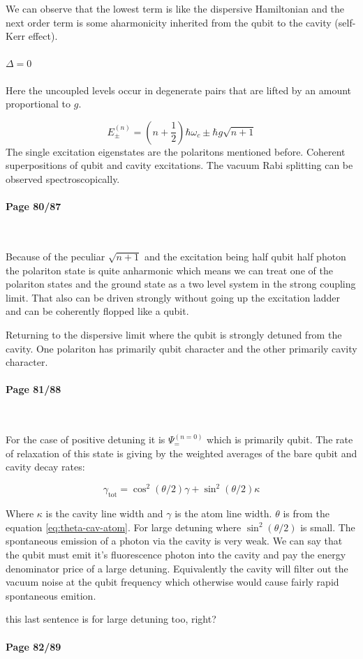 \documentclass[12pt]{article}
\numberwithin{equation}{subsection}
\newcommand\ask[1]{
{\color{red}
#1
}
}
\newcommand\page[1]{
{
\color{blue}\paragraph{
Page #1
}\mbox{}\\
}
}
\begin{document}
We can observe that the lowest term is like the dispersive Hamiltonian \label{eq:dispersiveH} and the next order term is some aharmonicity inherited from the qubit to the cavity (self-Kerr effect). 

\paragraph{$\Delta = 0$}  Here the uncoupled levels occur in degenerate pairs that are lifted by an amount proportional to $g$.

\begin{equation}
    E^{(n)}_\pm =\left(n+\frac{1}{2}\right) \hbar \omega_c \pm \hbar g \sqrt{n+1}
\end{equation}
The single excitation eigenstates are the polaritons mentioned before. Coherent superpositions of qubit and cavity excitations. The vacuum Rabi splitting can be observed spectroscopically. 
\page{80/87}
Because of the peculiar $\sqrt{n+1}$ and the excitation being half qubit half photon the polariton state is quite anharmonic which means we can treat one of the polariton states and the ground state as a two level system in the strong coupling limit. That also can be driven strongly without going up the excitation ladder and can be coherently flopped like a qubit.

Returning to the dispersive limit where the qubit is strongly detuned from the cavity. One polariton has primarily qubit character and the other primarily cavity character.

\page{81/88}

For the case of positive detuning it is $\Psi_=^{(n=0)}$ which is primarily qubit.
The rate of relaxation of this state is giving by the weighted averages of the bare qubit and cavity decay rates:

\begin{equation}
    \gamma_{\textrm{tot}} = \cos^2(\theta/2)\gamma + \sin^2(\theta/2)\kappa
\end{equation}

Where $\kappa$ is the cavity line width and $ \gamma$ is the atom line width. $\theta$ is from the equation \ref{eq:theta-cav-atom}.
For large detuning where $\sin^2(\theta/2)$ is small. The spontaneous emission of a photon via the cavity is very weak. We can say that the qubit must emit it's fluorescence photon into the cavity and pay the energy denominator price of a large detuning. Equivalently the cavity will filter out the vacuum noise at the qubit frequency which otherwise would cause fairly rapid spontaneous emition. 
\ask{this last sentence is for large detuning too, right?}
\page{82/89}
\end{document}
